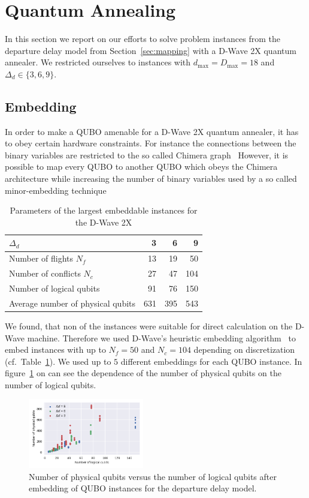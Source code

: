 \section{Quantum Annealing}
In this section we report on our efforts to solve problem instances from the departure delay model from Section~\ref{sec:mapping} with a D-Wave 2X quantum annealer.
We restricted ourselves to instances with $d_\text{max}=D_\text{max}=18$ and $\Delta_d \in \{3, 6, 9\}$.
\subsection{Embedding}
In order to make a QUBO amenable for a D-Wave 2X quantum annealer, it has to obey certain hardware constraints.
For instance the connections between the binary variables are restricted to the so called Chimera graph~\cite{Rieffel2015}
However, it is possible to map every QUBO to another QUBO which obeys the Chimera architecture while increasing the number of binary variables used by a so called minor-embedding technique~\cite{choi}

\begin{table}[h]
    \begin{tabular}{lrrr}
    \toprule
    $\Delta_d$ &    3 &    6 &    9 \\
    \midrule
    Number of flights $N_f$   &   13 &   19 &   50 \\
    Number of conflicts $N_c$ &   27 &   47 &  104 \\
    Number of logical qubits  &   91 &   76 &  150 \\
    Average number of physical qubits &  631 &  395 &  543 \\
    \bottomrule
    \end{tabular}
    \caption{Parameters of the largest embeddable instances for the D-Wave 2X}
\label{tab:embedding}
\end{table}

We found, that non of the instances were suitable for direct calculation on the D-Wave machine.
Therefore we used D-Wave's heuristic embedding algorithm~\cite{DWaveEmbeddingHeuristic} to embed instances with up to $N_f=50$ and $N_c=104$ depending on discretization (cf.\ Table~\ref{tab:embedding}).
We used up to $5$ different embeddings for each QUBO instance.
In figure~\ref{fig:number_of_physical_qubits} on can see the dependence of the number of physical qubits on the number of logical qubits.


\begin{figure}[htpb]
    \centering
    \includegraphics[width=0.45\textwidth]{./pics/physicalVsLogicalNumberOfQubits.pdf}
    \caption{Number of physical qubits versus the number of logical qubits after embedding of QUBO instances for the departure delay model.}
\label{fig:number_of_physical_qubits}
\end{figure}




